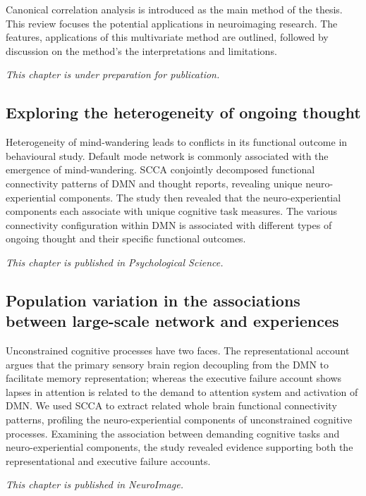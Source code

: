 Canonical correlation analysis is introduced as the main method of the thesis. This review focuses the potential applications in neuroimaging research. The features, applications of this multivariate method are outlined, followed by discussion on the method's the interpretations and limitations. 

\textit{This chapter is under preparation for publication. } 

\subsection*{Exploring the heterogeneity of ongoing thought}
Heterogeneity of mind-wandering leads to conflicts in its functional outcome in behavioural study. Default mode network is commonly associated with the emergence of mind-wandering. SCCA conjointly decomposed functional connectivity patterns of DMN and thought reports, revealing unique neuro-experiential components. The study then revealed that the neuro-experiential components each associate with unique cognitive task measures. The various connectivity configuration within DMN is associated with different types of ongoing thought and their specific functional outcomes.

\textit{This chapter is published in Psychological Science.}

\subsection*{Population variation in the associations between large-scale network and experiences}
Unconstrained cognitive processes have two faces. The representational account argues that the primary sensory brain region decoupling from the DMN to facilitate memory representation; whereas the executive failure account shows lapses in attention is related to the demand to attention system and activation of DMN. We used SCCA to extract related whole brain functional connectivity patterns, profiling the neuro-experiential components of unconstrained cognitive processes. Examining the association between demanding cognitive tasks and neuro-experiential components, the study revealed evidence supporting both the representational and executive failure accounts.

\textit{This chapter is published in NeuroImage.}

